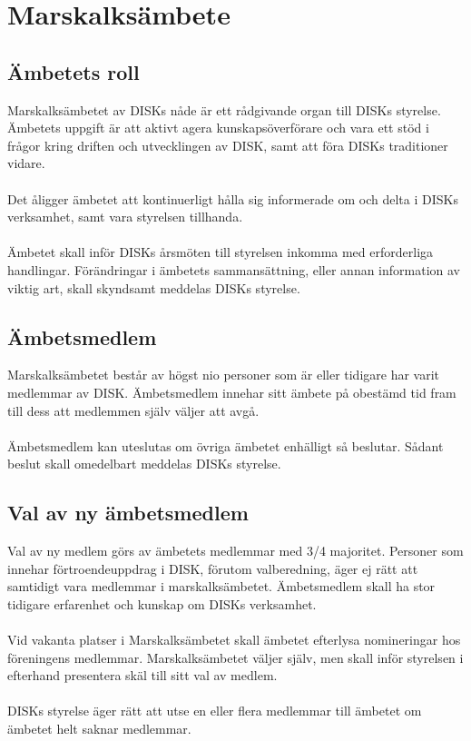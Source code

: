 \clearpage

\section{Marskalksämbete}
\label{sec:marskalksambete}

	\subsection{Ämbetets roll}
	\label{subsec:ambetetsroll}
		Marskalksämbetet av DISKs nåde är ett rådgivande organ till DISKs styrelse. Ämbetets uppgift är att aktivt agera kunskapsöverförare och vara ett stöd i frågor kring driften och utvecklingen av DISK, samt att föra DISKs traditioner vidare.\\ \\
		Det åligger ämbetet att kontinuerligt hålla sig informerade om och delta i DISKs verksamhet, samt vara styrelsen tillhanda.\\ \\
		Ämbetet skall inför DISKs årsmöten till styrelsen inkomma med erforderliga handlingar. 
Förändringar i ämbetets sammansättning, eller annan information av viktig art, skall skyndsamt meddelas DISKs styrelse.

	\subsection{Ämbetsmedlem}
	\label{subsec:ambetsmedlem}
		Marskalksämbetet består av högst nio personer som är eller tidigare har varit medlemmar av DISK. Ämbetsmedlem innehar sitt ämbete på obestämd tid fram till dess att medlemmen själv väljer att avgå.\\ \\
		Ämbetsmedlem kan uteslutas om övriga ämbetet enhälligt så beslutar. Sådant beslut skall omedelbart meddelas DISKs styrelse.

	\subsection{Val av ny ämbetsmedlem}
	\label{subsec:valavnyambetsmedlem}
		Val av ny medlem görs av ämbetets medlemmar med 3/4 majoritet. Personer som innehar förtroendeuppdrag i DISK, förutom valberedning, äger ej rätt att samtidigt vara medlemmar i marskalksämbetet. Ämbetsmedlem skall ha stor tidigare erfarenhet och kunskap om DISKs verksamhet.\\ \\
		Vid vakanta platser i Marskalksämbetet skall ämbetet efterlysa nomineringar hos föreningens medlemmar. Marskalksämbetet väljer själv, men skall inför styrelsen i efterhand presentera skäl till sitt val av medlem.\\ \\
		DISKs styrelse äger rätt att utse en eller flera medlemmar till ämbetet om ämbetet helt saknar medlemmar.

